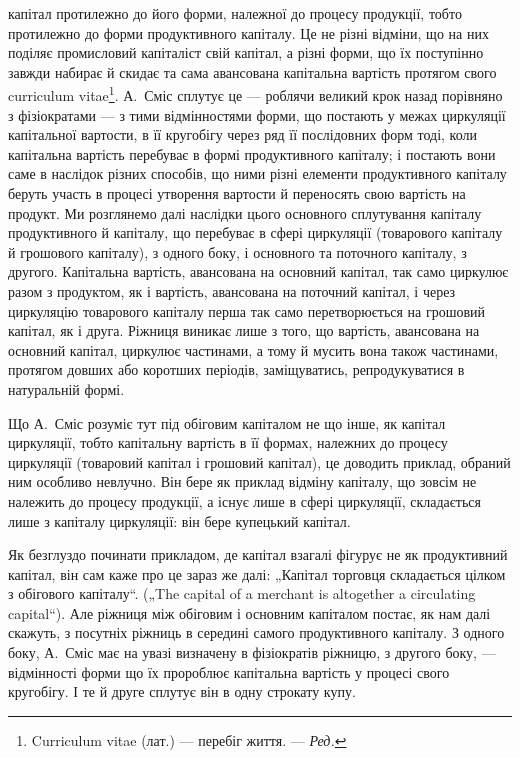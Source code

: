 \parcont{}  %
капітал протилежно до його форми, належної до процесу продукції,
тобто протилежно до форми продуктивного капіталу. Це не різні
відміни, що на них поділяє промисловий капіталіст свій капітал, а різні
форми, що їх поступінно завжди набирає й скидає та сама авансована
капітальна вартість протягом свого curriculum vitae\footnote*{
Curriculum vitae (лат.) — перебіг життя. — \emph{Ред.}
}. А.~Сміс сплутує це —
роблячи великий крок назад порівняно з фізіократами — з тими відмінностями
форми, що постають у межах циркуляції капітальної вартости, в її кругобігу
через ряд її послідовних форм тоді, коли капітальна вартість перебуває
в формі продуктивного капіталу; і постають вони саме в наслідок
різних способів, що ними різні елементи продуктивного капіталу беруть
участь в процесі утворення вартости й переносять свою вартість на продукт.
Ми розглянемо далі наслідки цього основного сплутування капіталу
продуктивного й капіталу, що перебуває в сфері циркуляції (товарового
капіталу й грошового капіталу), з одного боку, і основного та поточного
капіталу, з другого. Капітальна вартість, авансована на основний капітал,
так само циркулює разом з продуктом, як і вартість, авансована на поточний
капітал, і через циркуляцію товарового капіталу перша так само перетворюється
на грошовий капітал, як і друга. Ріжниця виникає лише з того,
що вартість, авансована на основний капітал, циркулює частинами, а тому
й мусить вона також частинами, протягом довших або коротших періодів,
заміщуватись, репродукуватися в натуральній формі.

Що А.~Сміс розуміє тут під обіговим капіталом не що інше, як капітал
циркуляції, тобто капітальну вартість в її формах, належних до процесу
циркуляції (товаровий капітал і грошовий капітал), це доводить приклад,
обраний ним особливо невлучно. Він бере як приклад відміну капіталу, що
зовсім не належить до процесу продукції, а існує лише в сфері циркуляції,
складається лише з капіталу циркуляції: він бере купецький капітал.

Як безглуздо починати прикладом, де капітал взагалі фігурує не як
продуктивний капітал, він сам каже про це зараз же далі: „Капітал торговця
складається цілком з обігового капіталу“. („The capital of a merchant
is altogether a circulating capital“). Але ріжниця між обіговим і основним
капіталом постає, як нам далі скажуть, з посутніх ріжниць в середині
самого продуктивного капіталу. З одного боку, А.~Сміс має на
увазі визначену в фізіократів ріжницю, з другого боку, — відмінності форми
що їх пророблює капітальна вартість у процесі свого кругобігу. І те
й друге сплутує він в одну строкату купу.

